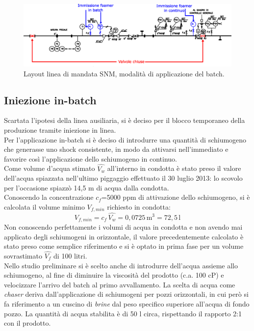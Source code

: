 \begin{figure}[htbp] %
    \centering
    \includegraphics[width=\textwidth]{fig/test/mandata.eps}
    \caption{Layout linea di mandata SNM, modalità di applicazione del batch.} 
    \label{fig:mandata}
\end{figure}

\subsection{Iniezione in-batch}
Scartata l'ipotesi della linea ausiliaria, si è deciso per il blocco temporaneo della produzione tramite iniezione in linea.\\
Per l'applicazione in-batch si è deciso di introdurre una quantità di schiumogeno che generasse uno shock consistente, in modo da attivarsi nell'immediato e favorire così l'applicazione dello schiumogeno in continuo.\\
Come volume d'acqua stimato \(\hat{V_{w}}\) all'interno in condotta è stato preso il valore dell'acqua spiazzata nell'ultimo piggaggio effettuato il 30 luglio 2013: lo scovolo per l'occasione spiazzò 14,5 m di acqua dalla condotta.\\
Conoscendo la concentrazione \(c_f\)=5000 ppm di attivazione dello schiumogeno, si è calcolata il volume minimo \(V_{f,min}\) richiesto in condotta:
\[V_{f,min}= c_f\,\hat{V_w}=0,0725 \, \mathrm{m^3}=72,5 \, \mathrm{l} \label{eq:volfoamer}\]
Non conoscendo perfettamente i volumi di acqua in condotta e non avendo mai applicato degli schiumogeni in orizzontale, il valore precedentemente calcolato è stato preso come semplice riferimento e si è optato in prima fase per un volume sovrastimato \(\hat{V_{f}}\) di 100 litri.\\
Nello studio preliminare si è scelto anche di introdurre dell'acqua assieme allo schiumogeno, al fine di diminuire la viscosità del prodotto (c.a. 100 cP) e velocizzare l'arrivo del batch al primo avvallamento. La scelta di acqua come \textit{chaser} deriva dall'applicazione di schiumogeni per pozzi orizzontali, in cui però si fa riferimento a un cuscino di \textit{brine} dal peso specifico superiore all'acqua di fondo pozzo. La quantità di acqua stabilita è di 50 l circa, rispettando il rapporto 2:1 con il prodotto.\\
